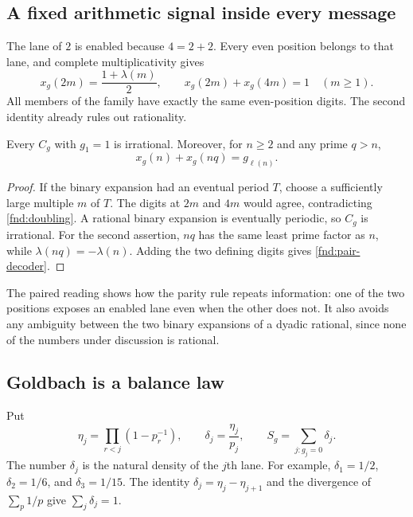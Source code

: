 \subsection{A fixed arithmetic signal inside every message}

The lane of $2$ is enabled because $4=2+2$.  Every even position belongs
to that lane, and complete multiplicativity gives
\begin{equation}
 x_g(2m)=\frac{1+\lambda(m)}2,\qquad
 x_g(2m)+x_g(4m)=1 \quad(m\ge1).
 \label{fnd:doubling}
\end{equation}
All members of the family have exactly the same even-position digits.
The second identity already rules out rationality.

\begin{proposition}\label{fnd:irrational}
Every $C_g$ with $g_1=1$ is irrational.  Moreover, for $n\ge2$ and any
prime $q>n$,
\begin{equation}
 x_g(n)+x_g(nq)=g_{\ell(n)}.
 \label{fnd:pair-decoder}
\end{equation}
\end{proposition}
\begin{proof}
If the binary expansion had an eventual period $T$, choose a sufficiently
large multiple $m$ of $T$.  The digits at $2m$ and $4m$ would agree,
contradicting \eqref{fnd:doubling}.  A rational binary expansion is
eventually periodic, so $C_g$ is irrational.  For the second assertion,
$nq$ has the same least prime factor as $n$, while
$\lambda(nq)=-\lambda(n)$.  Adding the two defining digits gives
\eqref{fnd:pair-decoder}.
\end{proof}

The paired reading shows how the parity rule repeats information: one
of the two positions exposes an enabled lane even when the other does
not.  It also avoids any ambiguity between the two binary expansions
of a dyadic rational, since none of the numbers under discussion is
rational.

\subsection{Goldbach is a balance law}

Put
\begin{equation}
 \eta_j=\prod_{r<j}(1-p_r^{-1}),\qquad
 \delta_j=\frac{\eta_j}{p_j},\qquad
 S_g=\sum_{j:g_j=0}\delta_j.
 \label{fnd:lane-densities}
\end{equation}
The number $\delta_j$ is the natural density of the $j$th lane.  For
example, $\delta_1=1/2$, $\delta_2=1/6$, and $\delta_3=1/15$.
The identity $\delta_j=\eta_j-\eta_{j+1}$ and the divergence of
$\sum_p1/p$ give $\sum_j\delta_j=1$.

